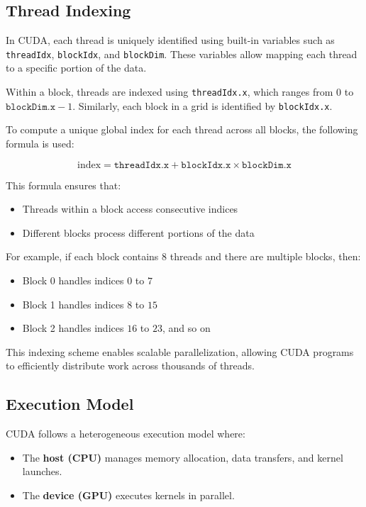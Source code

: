 \subsection{Thread Indexing}

In CUDA, each thread is uniquely identified using built-in variables such as \texttt{threadIdx}, \texttt{blockIdx}, and \texttt{blockDim}. These variables allow mapping each thread to a specific portion of the data.

Within a block, threads are indexed using \texttt{threadIdx.x}, which ranges from $0$ to $\texttt{blockDim.x} - 1$. Similarly, each block in a grid is identified by \texttt{blockIdx.x}.

To compute a unique global index for each thread across all blocks, the following formula is used:

\begin{equation}
\text{index} = \texttt{threadIdx.x} + \texttt{blockIdx.x} \times \texttt{blockDim.x}
\end{equation}

This formula ensures that:
\begin{itemize}
    \item Threads within a block access consecutive indices
    \item Different blocks process different portions of the data
\end{itemize}

For example, if each block contains 8 threads and there are multiple blocks, then:
\begin{itemize}
    \item Block 0 handles indices $0$ to $7$
    \item Block 1 handles indices $8$ to $15$
    \item Block 2 handles indices $16$ to $23$, and so on
\end{itemize}

This indexing scheme enables scalable parallelization, allowing CUDA programs to efficiently distribute work across thousands of threads.


\subsection{Execution Model}

CUDA follows a heterogeneous execution model where:

\begin{itemize}
    \item The \textbf{host (CPU)} manages memory allocation, data transfers, and kernel launches.
    \item The \textbf{device (GPU)} executes kernels in parallel.
\end{itemize}


